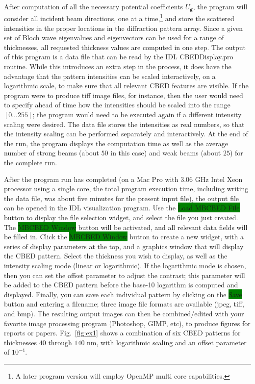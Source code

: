 \documentclass[DIV=calc, paper=letter, fontsize=11pt]{scrartcl}	 %
\newcommand{\button}[1]{\colorbox{green}{\textsf{#1}} button}
\begin{document}
After computation of all the necessary potential coefficients $U_{\mathbf{g}}$, the
program will consider all incident beam directions, one at a time,\footnote{A later program version will employ OpenMP multi core capabilities.}
and store the scattered intensities in the proper locations in the diffraction pattern array.  Since a given set of Bloch wave eigenvalues
and eigenvectors can be used for a range of thicknesses, all requested thickness values are computed in one step.  The output of this
program is a data file that can be read by the IDL \textsf{CBEDDisplay.pro} routine.  While this introduces an extra step in the process,
it does have the advantage that the pattern intensities can be scaled interactively, on a logarithmic scale, to make sure that all relevant 
CBED features are visible.  If the program were to produce tiff image files, for instance, then the user would need to specify ahead of time 
how the intensities should be scaled into the range $[0\ldots 255]$; the program would need to be executed again if a different intensity 
scaling were desired.  The data file stores the intensities as real numbers, so that the intensity scaling can be performed separately and
interactively.  At the end of the run, the program displays the computation time as well as the average number of strong beams (about $50$ in this
case) and weak beams (about $25$) for the complete run.  

After the program run has completed (on a Mac Pro with $3.06$ GHz Intel Xeon processor using a single core, 
the total program execution time, including writing the data file, was about five minutes for the 
present input file), the output file can be opened in the IDL visualization program.  Use the \button{Load MBCBED File} to display 
the file selection widget, and select the file you just created.  The \button{MBCBED Window}  will be activated, and all relevant data fields
will be filled in.  Click the \button{MBCBED Window}  to create a new widget, with a series of display parameters at the top, and a graphics
window that will display the CBED pattern.  Select the thickness you wish to display, as well as the intensity scaling mode (linear or 
logarithmic). If the logarithmic mode is chosen, then you can set the offset parameter to adjust the contrast;  this parameter will be added 
to the CBED pattern before the base-10 logarithm is computed and displayed.  Finally, you can save each individual pattern by clicking
on the \button{Save} and entering a filename; three image file formats are available (jpeg, tiff, and bmp).
The resulting output images can then be combined/edited with your favorite image processing program (Photoshop, GIMP, etc), to produce
figures for reports or papers.  Fig.~\ref{fig:ex1} shows a combination of six CBED patterns for thicknesses $40$ through $140$ nm, with
logarithmic scaling and an offset parameter of $10^{-4}$.
\end{document}
